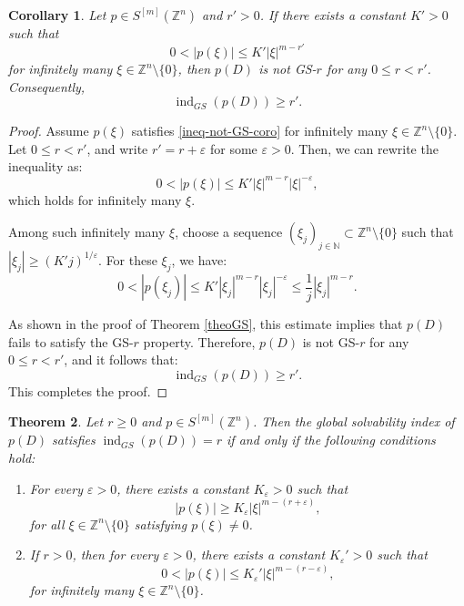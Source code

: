\documentclass[11pt]{amsart}
\numberwithin{equation}{section}
\newtheorem{theorem}{Theorem}[section]
\newtheorem{corollary}[theorem]{Corollary}
\theoremstyle{definition}
\begin{document}
	
	\begin{corollary}\label{coroGS1}
		Let \( p \in S^{[m]}(\mathbb{Z}^n) \) and \( r' > 0 \). If there exists a constant \( K' > 0 \) such that
		\begin{equation} \label{ineq-not-GS-coro}
			0 < |p(\xi)| \leq K' |\xi|^{m - r'}
		\end{equation}
		for infinitely many \( \xi \in \mathbb{Z}^n \setminus \{0\} \), then \( p(D) \) is not GS-\( r \) for any \( 0\leq r < r' \). Consequently,
		\[
			\operatorname{ind}_{GS}(p(D)) \geq r'.
		\]
	\end{corollary}

	\begin{proof}
		Assume \( p(\xi) \) satisfies \eqref{ineq-not-GS-coro} for infinitely many \( \xi \in \mathbb{Z}^n \setminus \{0\} \). Let \( 0\leq r < r' \), and write \( r' = r + \varepsilon \) for some \( \varepsilon > 0 \). Then, we can rewrite the inequality as:
		\[
		0 < |p(\xi)| \leq K' |\xi|^{m - r} |\xi|^{-\varepsilon},
		\]
		which holds for infinitely many \( \xi \).
		
		Among such infinitely many $\xi$, choose a sequence \( (\xi_j)_{j \in \mathbb{N}} \subset \mathbb{Z}^n \setminus \{0\} \) such that \( |\xi_j| \geq (K' j)^{1/\varepsilon} \). For these \( \xi_j \), we have:
		\[
		0<|p(\xi_j)| \leq K' |\xi_j|^{m - r} |\xi_j|^{-\varepsilon} \leq \frac{1}{j} |\xi_j|^{m - r}.
		\]
		
		As shown in the proof of Theorem \ref{theoGS}, this estimate implies that \( p(D) \) fails to satisfy the GS-\( r \) property. Therefore, \( p(D) \) is not GS-\( r \) for any \( 0\leq r < r' \), and it follows that:
		\[
		\operatorname{ind}_{GS}(p(D)) \geq r'.
		\]
		This completes the proof.
	\end{proof}
	



		\begin{theorem}\label{theoGSindex}
		Let \( r \geq 0 \) and \( p \in S^{[m]}(\mathbb{Z}^n) \). Then the global solvability index of \( p(D) \) satisfies \( \operatorname{ind}_{GS}(p(D)) = r \) if and only if the following conditions hold:
		\begin{enumerate}
			\item[{\it (i)}] For every \( \varepsilon > 0 \), there exists a constant \( K_\varepsilon > 0 \) such that
			\begin{equation}\label{ineqGS_lower}
				|p(\xi)| \geq K_\varepsilon |\xi|^{m - (r + \varepsilon)},
			\end{equation}
			for all \( \xi \in \mathbb{Z}^n \setminus \{0\} \) satisfying \( p(\xi) \neq 0 \).
			
			\item[{\it (ii)}] If \( r > 0 \), then for every \( \varepsilon > 0 \), there exists a constant \( K_{\varepsilon}' > 0 \) such that
			\begin{equation}\label{ineqGS_upper}
				0 < |p(\xi)| \leq K_{\varepsilon}' |\xi|^{m - (r - \varepsilon)},
			\end{equation}
			for infinitely many \( \xi \in \mathbb{Z}^n \setminus \{0\} \).
		\end{enumerate}
	\end{theorem}
\end{document}
